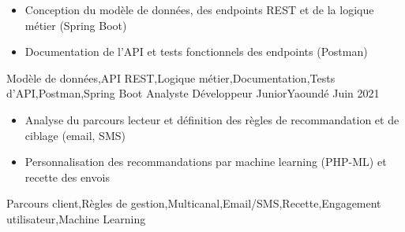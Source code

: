 \begin{experiences}
{                      \begin{itemize}
                        \item Conception du modèle de données, des endpoints REST et de la logique métier (Spring Boot)
                        \item Documentation de l'API et tests fonctionnels des endpoints (Postman)
                      \end{itemize}
                    }
                    {Modèle de données,API REST,Logique métier,Documentation,Tests d'API,Postman,Spring Boot}
  \emptySeparator
     {Analyste Développeur Junior}{}{Yaoundé}
    {Juin 2021} {
                      \begin{itemize}
                        \item Analyse du parcours lecteur et définition des règles de recommandation et de ciblage (email, SMS)
                        \item Personnalisation des recommandations par machine learning (PHP-ML) et recette des envois
                      \end{itemize}
                    }
                    {Parcours client,Règles de gestion,Multicanal,Email/SMS,Recette,Engagement utilisateur,Machine Learning}
\end{experiences}
 